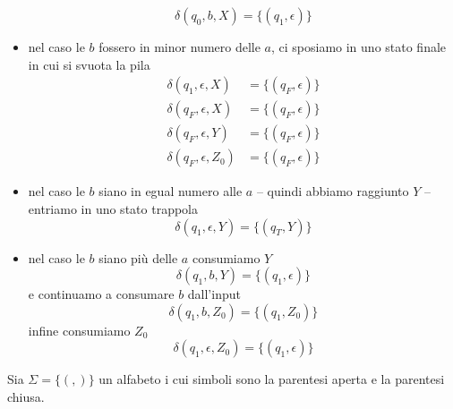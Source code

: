\documentclass[12pt, answers]{exam}
\begin{document}
\begin{questions}
\begin{solution}
\begin{itemize}
				$$ \delta(q_0, b, X) = \{(q_1, \epsilon)\} $$
			\item nel caso le $b$ fossero in minor numero delle $a$, ci sposiamo in uno stato finale in cui si svuota la pila
				\begin{align*}
					\delta(q_1, \epsilon, X) &= \{ (q_F, \epsilon) \} \\
					\delta(q_F, \epsilon, X) &= \{ (q_F, \epsilon) \} \\
					\delta(q_F, \epsilon, Y) &= \{ (q_F, \epsilon) \} \\
					\delta(q_F, \epsilon, Z_0) &= \{ (q_F, \epsilon) \}
				\end{align*}
			\item nel caso le $b$ siano in egual numero alle $a$ -- quindi abbiamo raggiunto $Y$ -- entriamo in uno stato trappola
				$$ \delta(q_1, \epsilon, Y) = \{ (q_T, Y) \} $$
			\item nel caso le $b$ siano più delle $a$ consumiamo $Y$
				$$ \delta(q_1, b, Y) = \{(q_1, \epsilon)\} $$
				e continuamo a consumare $b$ dall'input
				$$ \delta(q_1, b, Z_0) = \{(q_1, Z_0)\} $$
				infine consumiamo $Z_0$
				$$ \delta(q_1, \epsilon, Z_0) = \{(q_1, \epsilon)\} $$
		\end{itemize}
	\end{solution}
	\question Sia $\Sigma = \{(, )\}$ un alfabeto i cui simboli sono la parentesi aperta e la parentesi chiusa.
	\begin{parts}

\end{parts}
\end{questions}
\end{document}
